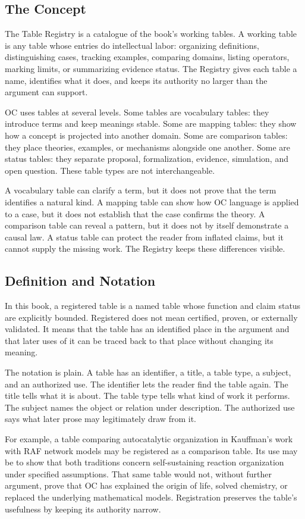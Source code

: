 \documentclass[11pt,a4paper,openany]{book}
\begin{document}
\subsection{The Concept}
The Table Registry is a catalogue of the book's working tables. A working table is any table whose entries do intellectual labor: organizing definitions, distinguishing cases, tracking examples, comparing domains, listing operators, marking limits, or summarizing evidence status. The Registry gives each table a name, identifies what it does, and keeps its authority no larger than the argument can support. \cite{nicolis_prigogine_selforg,kauffman_autocatalytic}\par
OC uses tables at several levels. Some tables are vocabulary tables: they introduce terms and keep meanings stable. Some are mapping tables: they show how a concept is projected into another domain. Some are comparison tables: they place theories, examples, or mechanisms alongside one another. Some are status tables: they separate proposal, formalization, evidence, simulation, and open question. These table types are not interchangeable.\par
A vocabulary table can clarify a term, but it does not prove that the term identifies a natural kind. A mapping table can show how OC language is applied to a case, but it does not establish that the case confirms the theory. A comparison table can reveal a pattern, but it does not by itself demonstrate a causal law. A status table can protect the reader from inflated claims, but it cannot supply the missing work. The Registry keeps these differences visible.\par
\subsection{Definition and Notation}
In this book, a registered table is a named table whose function and claim status are explicitly bounded. Registered does not mean certified, proven, or externally validated. It means that the table has an identified place in the argument and that later uses of it can be traced back to that place without changing its meaning. \cite{nicolis_prigogine_selforg,kauffman_autocatalytic}\par
The notation is plain. A table has an identifier, a title, a table type, a subject, and an authorized use. The identifier lets the reader find the table again. The title tells what it is about. The table type tells what kind of work it performs. The subject names the object or relation under description. The authorized use says what later prose may legitimately draw from it.\par
For example, a table comparing autocatalytic organization in Kauffman's work with RAF network models may be registered as a comparison table. Its use may be to show that both traditions concern self-sustaining reaction organization under specified assumptions. That same table would not, without further argument, prove that OC has explained the origin of life, solved chemistry, or replaced the underlying mathematical models. Registration preserves the table's usefulness by keeping its authority narrow.\par
\end{document}

